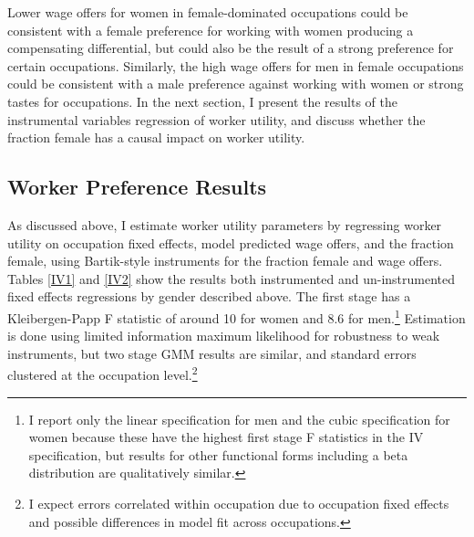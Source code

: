 \documentclass[12pt]{article}
\begin{document}
Lower wage offers for women in female-dominated occupations could be consistent with a female preference for working with women producing a compensating differential, but could also be the result of a strong preference for certain occupations. Similarly, the high wage offers for men in female occupations could be consistent with a male preference against working with women or strong tastes for occupations. In the next section, I present the results of the instrumental variables regression of worker utility, and discuss whether the fraction female has a causal impact on worker utility.















\subsection{Worker Preference Results}
As discussed above, I estimate worker utility parameters by regressing worker utility on occupation fixed effects, model predicted wage offers, and the fraction female, using Bartik-style instruments for the fraction female and wage offers. Tables \ref{IV1} and \ref{IV2} show the results both instrumented and un-instrumented fixed effects regressions by gender described above. The first stage has a Kleibergen-Papp F statistic of around 10 for women and 8.6 for men.\footnote{I report only the linear specification for men and the cubic specification for women because these have the highest first stage F statistics in the IV specification, but results for other functional forms including a beta distribution are qualitatively similar.} Estimation is done using limited information maximum likelihood for robustness to weak instruments, but two stage GMM results are similar, and standard errors clustered at the occupation level.\footnote{I expect errors correlated within occupation due to occupation fixed effects and possible differences in model fit across occupations.} 
\end{document}

